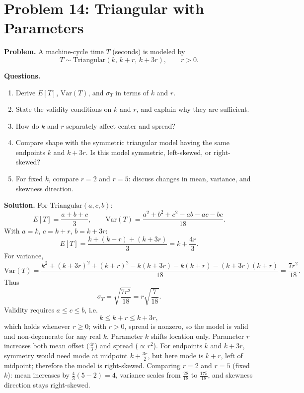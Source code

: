 \section{Problem 14: Triangular with Parameters}

\textbf{Problem.}
A machine-cycle time \(T\) (seconds) is modeled by
\[
T\sim \text{Triangular}(k,\,k+r,\,k+3r),\qquad r>0.
\]

\textbf{Questions.}
\begin{enumerate}
  \item Derive \(E[T]\), \(\mathrm{Var}(T)\), and \(\sigma_T\) in terms of \(k\) and \(r\).
  \item State the validity conditions on \(k\) and \(r\), and explain why they are sufficient.
  \item How do \(k\) and \(r\) separately affect center and spread?
  \item Compare shape with the symmetric triangular model having the same endpoints \(k\) and \(k+3r\). Is this model symmetric, left-skewed, or right-skewed?
  \item For fixed \(k\), compare \(r=2\) and \(r=5\): discuss changes in mean, variance, and skewness direction.
\end{enumerate}

\textbf{Solution.}
For \(\text{Triangular}(a,c,b)\):
\[
E[T]=\frac{a+b+c}{3},\qquad
\mathrm{Var}(T)=\frac{a^2+b^2+c^2-ab-ac-bc}{18}.
\]
With \(a=k\), \(c=k+r\), \(b=k+3r\):
\[
E[T]=\frac{k+(k+r)+(k+3r)}{3}=k+\frac{4r}{3}.
\]
For variance,
\[
\mathrm{Var}(T)=\frac{k^2+(k+3r)^2+(k+r)^2-k(k+3r)-k(k+r)-(k+3r)(k+r)}{18}
=\frac{7r^2}{18}.
\]
Thus
\[
\sigma_T=\sqrt{\frac{7r^2}{18}}=r\sqrt{\frac{7}{18}}.
\]
Validity requires \(a\le c\le b\), i.e.
\[
k\le k+r\le k+3r,
\]
which holds whenever \(r\ge 0\); with \(r>0\), spread is nonzero, so the model is valid and non-degenerate for any real \(k\).
Parameter \(k\) shifts location only. Parameter \(r\) increases both mean offset (\(\frac{4r}{3}\)) and spread (\(\propto r^2\)).
For endpoints \(k\) and \(k+3r\), symmetry would need mode at midpoint \(k+\frac{3r}{2}\), but here mode is \(k+r\), left of midpoint; therefore the model is right-skewed.
Comparing \(r=2\) and \(r=5\) (fixed \(k\)): mean increases by \(\frac{4}{3}(5-2)=4\), variance scales from \(\frac{28}{18}\) to \(\frac{175}{18}\), and skewness direction stays right-skewed.
\begin{center}
\end{center}

